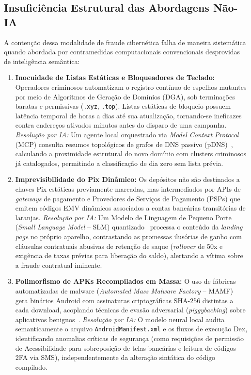\subsection{Insufici\^{e}ncia Estrutural das Abordagens N\~{a}o-IA}

A conten\c{c}\~{a}o dessa modalidade de fraude cibern\'{e}tica falha de maneira sistem\'{a}tica quando abordada por contramedidas computacionais convencionais desprovidas de intelig\^{e}ncia sem\^{a}ntica:
\begin{enumerate}
    \item \textbf{Inocuidade de Listas Est\'{a}ticas e Bloqueadores de Teclado:} Operadores criminosos automatizam o registro cont\'{i}nuo de espelhos mutantes por meio de Algoritmos de Gera\c{c}\~{a}o de Dom\'{i}nios (DGA), sob termina\c{c}\~{o}es baratas e permissivas (\texttt{.xyz}, \texttt{.top}). Listas est\'{a}ticas de bloqueio possuem lat\^{e}ncia temporal de horas a dias at\'{e} sua atualiza\c{c}\~{a}o, tornando-se ineficazes contra endere\c{c}os ativados minutos antes do disparo de uma campanha. \textit{Resolu\c{c}\~{a}o por IA:} Um agente local orquestrado via \textit{Model Context Protocol} (MCP) consulta resumos topol\'{o}gicos de grafos de DNS passivo (pDNS)~\cite{nabeel2020following}, calculando a proximidade estrutural do novo dom\'{i}nio com clusters criminosos j\'{a} catalogados, permitindo a classifica\c{c}\~{a}o de dia zero sem lista pr\'{e}via.
    \item \textbf{Imprevisibilidade do Pix Din\^{a}mico:} Os dep\'{o}sitos n\~{a}o s\~{a}o destinados a chaves Pix est\'{a}ticas previamente marcadas, mas intermediados por APIs de \textit{gateways} de pagamento e Provedores de Servi\c{c}os de Pagamento (PSPs) que emitem c\'{o}digos EMV din\^{a}micos associados a contas banc\'{a}rias transit\'{o}rias de laranjas. \textit{Resolu\c{c}\~{a}o por IA:} Um Modelo de Linguagem de Pequeno Porte (\textit{Small Language Model} -- SLM) quantizado~\cite{liu2024mobilellm} processa o conte\'{u}do da \textit{landing page} no pr\'{o}prio aparelho, contrastando as promessas ilus\'{o}rias de ganho com cl\'{a}usulas contratuais abusivas de reten\c{c}\~{a}o de saque (\textit{rollover} de 50x e exig\^{e}ncia de taxas pr\'{e}vias para libera\c{c}\~{a}o do saldo), alertando a v\'{i}tima sobre a fraude contratual iminente.
    \item \textbf{Polimorfismo de APKs Recompilados em Massa:} O uso de f\'{a}bricas automatizadas de malware (\textit{Automated Mass Malware Factory} -- MAMF)~\cite{li2025automated} gera bin\'{a}rios Android com assinaturas criptogr\'{a}ficas SHA-256 distintas a cada download, acoplando t\'{e}cnicas de evas\~{a}o adversarial (\textit{piggybacking}) sobre aplicativos benignos~\cite{zhang2025fighting}. \textit{Resolu\c{c}\~{a}o por IA:} O modelo neural local audita semanticamente o arquivo \texttt{AndroidManifest.xml} e os fluxos de execu\c{c}\~{a}o Dex, identificando anomalias cr\'{i}ticas de seguran\c{c}a (como requisi\c{c}\~{o}es de permiss\~{a}o de Acessibilidade para sobreposi\c{c}\~{a}o de telas banc\'{a}rias e leitura de c\'{o}digos 2FA via SMS), independentemente da altera\c{c}\~{a}o sint\'{a}tica do c\'{o}digo compilado.
\end{enumerate}

